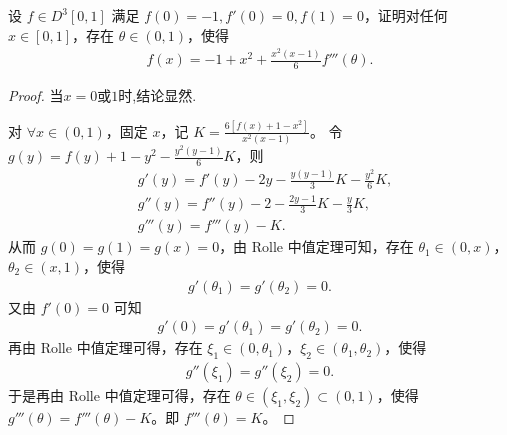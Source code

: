 \documentclass[../../main.tex]{subfiles}
\begin{document}
\begin{example}
设 $f \in D^3[0,1]$ 满足 $f(0) = -1, f'(0) = 0, f(1) = 0$，证明对任何 $x \in [0,1]$，存在 $\theta \in (0,1)$，使得
\begin{align*}
f(x) = -1 + x^2 + \frac{x^2 (x - 1)}{6} f'''(\theta).
\end{align*}
\end{example}
\begin{proof}
当$x=0$或$1$时,结论显然.

对 $\forall x\in (0,1)$，固定 $x$，记 $K=\frac{6[f(x) +1-x^2]}{x^2(x-1)}$。
令 $g(y) =f(y) +1-y^2-\frac{y^2(y-1)}{6}K$，则
\begin{align*}
&g'(y) =f'(y) -2y-\frac{y(y-1)}{3}K-\frac{y^2}{6}K, \\
&g''(y) =f''(y) -2-\frac{2y-1}{3}K-\frac{y}{3}K, \\
&g'''(y) =f'''(y) -K.
\end{align*}
从而 $g(0) =g(1) =g(x) =0$，由 Rolle 中值定理可知，存在 $\theta_1\in (0,x)$，$\theta_2\in (x,1)$，使得
\begin{align*}
g'(\theta_1) =g'(\theta_2) =0.
\end{align*}
又由 $f'(0) =0$ 可知
\begin{align*}
g'(0) =g'(\theta_1) =g'(\theta_2) =0.
\end{align*}
再由 Rolle 中值定理可得，存在 $\xi_1\in (0,\theta_1)$，$\xi_2\in (\theta_1,\theta_2)$，使得
\begin{align*}
g''(\xi_1) =g''(\xi_2) =0.
\end{align*}
于是再由 Rolle 中值定理可得，存在 $\theta \in (\xi_1,\xi_2) \subset (0,1)$，使得 $g'''(\theta) =f'''(\theta) -K$。即 $f'''(\theta) =K$。
\end{proof}
\end{document}
